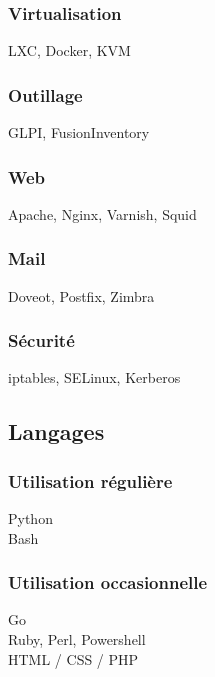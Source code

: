 \documentclass[a4paper]{tsacha-resume}
\begin{document}
\begin{minipage}[t]{0.25\textwidth}
  \subsubsection{Virtualisation}
  LXC, Docker, KVM

  \subsubsection{Outillage}
  GLPI, FusionInventory

  \subsubsection{Web}
  Apache, Nginx, Varnish, Squid

  \subsubsection{Mail}
  Doveot, Postfix, Zimbra

  \subsubsection{Sécurité}
  iptables, SELinux, Kerberos


  \subsection{Langages}
  \subsubsection{Utilisation régulière}
  Python\\
  Bash

  \subsubsection{Utilisation occasionnelle}
  Go \\
  Ruby, Perl, Powershell\\
  HTML / CSS / PHP

\end{minipage}
\hfill
\end{document}
